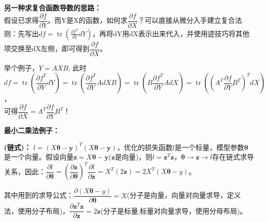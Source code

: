     \textbf{另一种求复合函数导数的思路：}
    \\
    假设已求得$\dfrac{\partial f}{\partial Y}$，而Y是X的函数，如何求$\dfrac{\partial f}{\partial X}$？可以直接从微分入手建立复合法则：先写出$d f=\operatorname{tr}\left(\frac{\partial f^{T}}{\partial Y} d Y\right)$，再将dY用dX表示出来代入，并使用迹技巧将其他项交换至dX左侧，即可得到$\dfrac{\partial f}{\partial X}$。


    举个例子，$Y=AXB$, 此时
    \\
    $d f=\operatorname{tr}\left(\dfrac{\partial f^{T}}{\partial Y} d Y\right)=\operatorname{tr}\left(\dfrac{\partial f^{T}}{\partial Y} A d X B\right)=\operatorname{tr}\left(B \dfrac{\partial f^{T}}{\partial Y} A d X\right)=\operatorname{tr}\left(\left(A^{T} \dfrac{\partial f}{\partial Y} B^{T}\right)^{T} d X\right)$，
    \\
    可得$\dfrac{\partial f}{\partial X}=A^{T} \dfrac{\partial f}{\partial Y} B^{T}$！

    \textbf{最小二乘法例子：}


    \textbf{(链式)：} $l=(X \bm{\theta-y})^{T}(X \bm{\theta-y})$，优化的损失函数$l$是一个标量，模型参数$\bm{\bm{\theta}}$是一个向量。假设向量$\bm{\bm{z}}=X \bm{\theta-y}$($\bm{z}$是向量)，则$l=\bm{z}^{T} \bm{z}$，$\bm{\theta} \rightarrow \bm{z} \rightarrow l$存在链式求导关系，因此：$\dfrac{\partial l}{\partial \bm{\theta}}=\left(\dfrac{\partial \bm{z}}{\partial \bm{\theta}}\right)^{T} \dfrac{\partial l}{\partial \mathbf{\bm{z}}}=X^{T}(2 \bm{z})=2 X^{T}(X \bm{\theta}-y)$。


    其中用到的求导公式：$\dfrac{\partial (X \bm{\theta}-y)}{\partial \bm{\theta}}=X$(分子是向量，向量对向量求导，定义法，使用分子布局)，$\dfrac{\partial \bm{z}^{T} \bm{z}}{\partial \bm{z}}=2 \bm{z}$(分子是标量,标量对向量求导，使用分母布局)。

